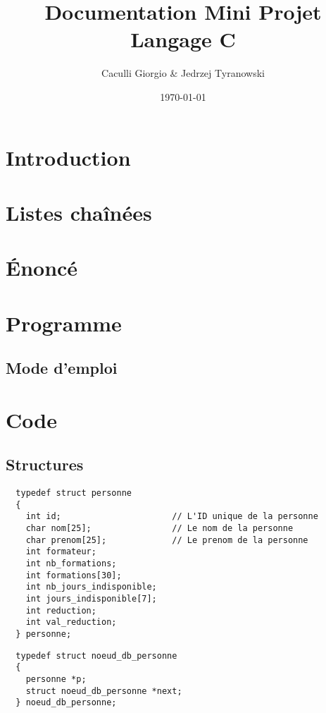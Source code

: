 \documentclass[11pt]{article}
\title{Documentation Mini Projet Langage C}
\author{Caculli Giorgio \& Jedrzej Tyranowski}
\date{\today}
\begin{document}
\maketitle
\begin{abstract}
\end{abstract}

\newpage
\section{Introduction}

\newpage
\section{Listes chaînées}

\newpage
\section{Énoncé}

\newpage
\section{Programme}
\subsection{Mode d'emploi}

\newpage
\section{Code}
\subsection{Structures}
\begin{lstlisting}
  typedef struct personne
  {
    int id;                      // L'ID unique de la personne
    char nom[25];                // Le nom de la personne
    char prenom[25];             // Le prenom de la personne
    int formateur;               
    int nb_formations;
    int formations[30];
    int nb_jours_indisponible;
    int jours_indisponible[7];
    int reduction;
    int val_reduction;
  } personne;
\end{lstlisting}

\begin{lstlisting}
  typedef struct noeud_db_personne
  {
    personne *p;
    struct noeud_db_personne *next;
  } noeud_db_personne;
\end{lstlisting}
\end{document}
